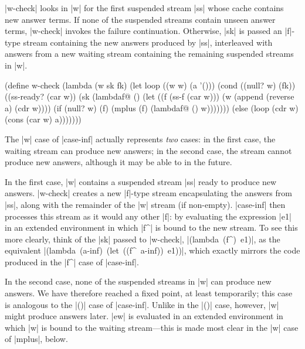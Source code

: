 \scheme|w-check| looks in \scheme|w| for the first suspended stream
\scheme|ss| whose cache contains new answer terms.  If none of the
suspended streams contain unseen answer terms, \scheme|w-check|
invokes the failure continuation.  Otherwise, \scheme|sk| is passed an
\scheme|f|-type stream containing the new answers produced by
\scheme|ss|, interleaved with answers from a new waiting stream
containing the remaining suspended streams in \scheme|w|.


\schemedisplayspace
\begin{schemedisplay}
(define w-check
  (lambda (w sk fk)
    (let loop ((w w) (a '()))
      (cond
        ((null? w) (fk))
        ((ss-ready? (car w))
         (sk (lambdaf@ ()
               (let ((f (ss-f (car w)))
                     (w (append (reverse a) (cdr w))))
                 (if (null? w) (f) (mplus (f) (lambdaf@ () w)))))))
        (else (loop (cdr w) (cons (car w) a)))))))
\end{schemedisplay}

The \scheme|w| case of \scheme|case-inf| actually represents
\emph{two} cases: in the first case, the waiting stream can produce
new answers; in the second case, the stream cannot produce new
answers, although it may be able to in the future.

In the first case, \scheme|w| contains a suspended stream \scheme|ss|
ready to produce new answers.  \scheme|w-check| creates a new
\scheme|f|-type stream encapsulating the answers from \scheme|ss|,
along with the remainder of the \scheme|w| stream (if non-empty).
\scheme|case-inf| then processes this stream as it would any other
\scheme|f|: by evaluating the expression \scheme|e1| in an extended
environment in which \scheme|f^| is bound to the new stream. To see
this more clearly, think of the \scheme|sk| passed to
\scheme|w-check|, \mbox{\scheme|(lambda (f^) e1)|}, as the equivalent
\mbox{\scheme|(lambda (a-inf) (let ((f^ a-inf)) e1))|}, which exactly
mirrors the code produced in the \scheme|f^| case of
\scheme|case-inf|.

In the second case, none of the suspended streams in \scheme|w| can
produce new answers.  We have therefore reached a fixed point, at
least temporarily; this case is analogous to the \scheme|()| case of
\scheme|case-inf|.  Unlike in the \scheme|()| case, however,
\scheme|w| might produce answers later.  \scheme|ew| is evaluated in
an extended environment in which \scheme|w| is bound to the waiting
stream---this is made most clear in the \scheme|w| case of
\scheme|mplus|, below.

